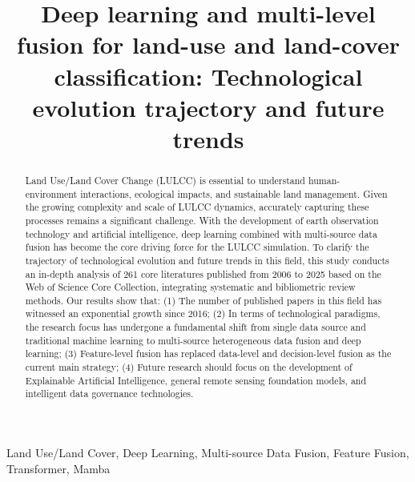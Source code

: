 \documentclass[]{interact}
\theoremstyle{plain}%
\theoremstyle{definition}
\theoremstyle{remark}
\begin{document}

\title{Deep learning and multi-level fusion for land-use and land-cover classification: Technological evolution trajectory and future trends}

\author{
}

\maketitle

\begin{abstract}
Land Use/Land Cover Change (LULCC) is essential to understand human-environment interactions, ecological impacts, and sustainable land management. Given the growing complexity and scale of LULCC dynamics, accurately capturing these processes remains a significant challenge. With the development of earth observation technology and artificial intelligence, deep learning combined with multi-source data fusion has become the core driving force for the LULCC simulation. To clarify the trajectory of technological evolution and future trends in this field, this study conducts an in-depth analysis of 261 core literatures published from 2006 to 2025 based on the Web of Science Core Collection, integrating systematic and bibliometric review methods. Our results show that: (1) The number of published papers in this field has witnessed an exponential growth since 2016; (2) In terms of technological paradigms, the research focus has undergone a fundamental shift from single data source and traditional machine learning to multi-source heterogeneous data fusion and deep learning; (3) Feature-level fusion has replaced data-level and decision-level fusion as the current main strategy; (4) Future research should focus on the development of Explainable Artificial Intelligence, general remote sensing foundation models, and intelligent data governance technologies.
\end{abstract}

\begin{keywords}
Land Use/Land Cover, Deep Learning, Multi-source Data Fusion, Feature Fusion, Transformer, Mamba
\end{keywords}
\end{document}
